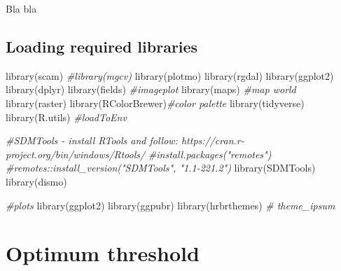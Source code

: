 \documentclass[
]{book}
\newenvironment{Shaded}{\begin{snugshade}}{\end{snugshade}}
\newcommand{\CommentTok}[1]{\textcolor[rgb]{0.56,0.35,0.01}{\textit{#1}}}
\newcommand{\FunctionTok}[1]{\textcolor[rgb]{0.00,0.00,0.00}{#1}}
\newcommand{\NormalTok}[1]{#1}
\begin{document}
Bla bla

\hypertarget{loading-required-libraries-1}{%
\subsection{Loading required libraries}\label{loading-required-libraries-1}}

\begin{Shaded}
\begin{Highlighting}[]
\FunctionTok{library}\NormalTok{(scam)}
\CommentTok{\#library(mgcv)}
\FunctionTok{library}\NormalTok{(plotmo)}
\FunctionTok{library}\NormalTok{(rgdal)}
\FunctionTok{library}\NormalTok{(ggplot2)}
\FunctionTok{library}\NormalTok{(dplyr)}
\FunctionTok{library}\NormalTok{(fields) }\CommentTok{\#imageplot}
\FunctionTok{library}\NormalTok{(maps) }\CommentTok{\#map world}
\FunctionTok{library}\NormalTok{(raster)}
\FunctionTok{library}\NormalTok{(RColorBrewer)}\CommentTok{\#color palette}
\FunctionTok{library}\NormalTok{(tidyverse)}
\FunctionTok{library}\NormalTok{(R.utils) }\CommentTok{\#loadToEnv}

\CommentTok{\#SDMTools {-} install RTools and follow: https://cran.r{-}project.org/bin/windows/Rtools/}
\CommentTok{\#install.packages("remotes")}
\CommentTok{\#remotes::install\_version("SDMTools", "1.1{-}221.2")}
\FunctionTok{library}\NormalTok{(SDMTools)}
\FunctionTok{library}\NormalTok{(dismo)}

\CommentTok{\#plots}
\FunctionTok{library}\NormalTok{(ggplot2)}
\FunctionTok{library}\NormalTok{(ggpubr)}
\FunctionTok{library}\NormalTok{(hrbrthemes) }\CommentTok{\# theme\_ipsum}
\end{Highlighting}
\end{Shaded}

\hypertarget{optimum-threshold}{%
\section{Optimum threshold}\label{optimum-threshold}}
\end{document}
